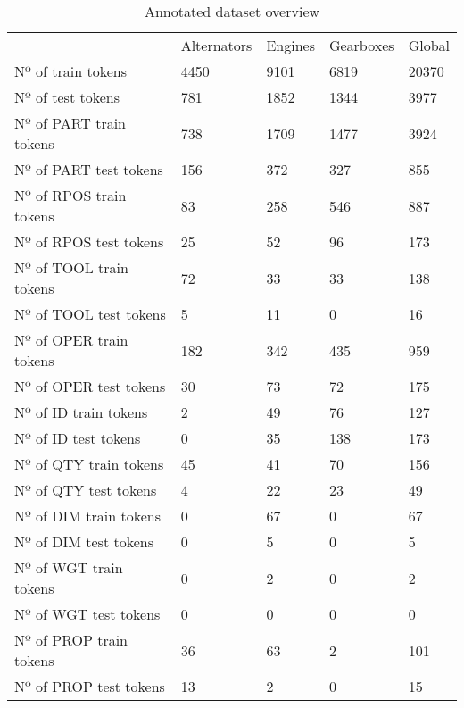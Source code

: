 \begin{table}[t]
	\caption{Annotated dataset overview}
	\centering
	\begin{tabu} { X[3.0,l,m] X[1.3,r,m] X[r,m] X[1.2,r,m] X[r,m] }
		\rowfont{\bfseries\itshape} & Alternators & Engines & Gearboxes & Global \\
		\lasthline
		Nº of train tokens & 4450 & 9101 & 6819 & 20370 \\
		Nº of test tokens & 781 & 1852 & 1344 & 3977 \\
		Nº of PART train tokens & 738 & 1709 & 1477 & 3924 \\
		Nº of PART test tokens & 156 & 372 & 327 & 855 \\
		Nº of RPOS train tokens & 83 & 258 & 546 & 887 \\
		Nº of RPOS test tokens & 25 & 52 & 96 & 173 \\
		Nº of TOOL train tokens & 72 & 33 & 33 & 138 \\
		Nº of TOOL test tokens & 5 & 11 & 0 & 16 \\
		Nº of OPER train tokens & 182 & 342 & 435 & 959 \\
		Nº of OPER test tokens & 30 & 73 & 72 & 175 \\
		Nº of ID train tokens & 2 & 49 & 76 & 127 \\
		Nº of ID test tokens & 0 & 35 & 138 & 173 \\
		Nº of QTY train tokens & 45 & 41 & 70 & 156 \\
		Nº of QTY test tokens & 4 & 22 & 23 & 49 \\
		Nº of DIM train tokens & 0 & 67 & 0 & 67 \\
		Nº of DIM test tokens & 0 & 5 & 0 & 5 \\
		Nº of WGT train tokens & 0 & 2 & 0 & 2 \\
		Nº of WGT test tokens & 0 & 0 & 0 & 0 \\
		Nº of PROP train tokens & 36 & 63 & 2 & 101 \\
		Nº of PROP test tokens & 13 & 2 & 0 & 15 \\
	\end{tabu}
	\label{tab:dataset-sources_annotated-dataset-overview}
\end{table}


